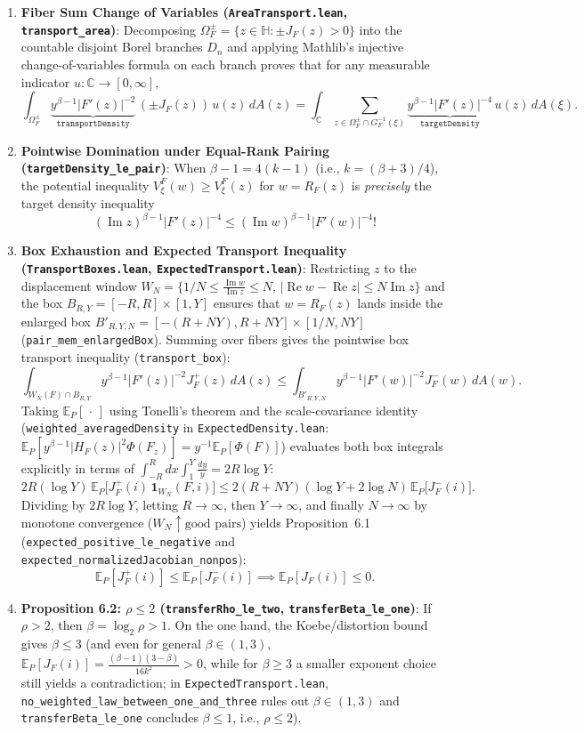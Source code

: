 \documentclass[11pt,reqno]{amsart}
\theoremstyle{definition}
\newcommand{\C}{\mathbb{C}}
\newcommand{\uhp}{\mathbb{H}}
\newcommand{\E}{\mathbb{E}}
\newcommand{\ImPart}{\operatorname{Im}}
\newcommand{\RePart}{\operatorname{Re}}
\begin{document}
\begin{enumerate}[label=(\arabic*)]
\item \textbf{Fiber Sum Change of Variables (\texttt{AreaTransport.lean}, \texttt{transport\_area})}:
Decomposing $\Omega_F^\pm = \{z \in \uhp : \pm J_F(z) > 0\}$ into the countable disjoint Borel branches $D_n$ and applying Mathlib's injective change-of-variables formula on each branch proves that for any measurable indicator $u : \C \to [0,\infty]$,
\[
\int_{\Omega_F^\pm} \underbrace{y^{\beta-1}|F'(z)|^{-2}}_{\texttt{transportDensity}}\,(\pm J_F(z))\,u(z)\,dA(z)
= \int_{\C} \sum_{z \in \Omega_F^\pm \cap G_F^{-1}(\xi)} \underbrace{y^{\beta-1}|F'(z)|^{-4}}_{\texttt{targetDensity}}\,u(z)\,dA(\xi).
\]
\item \textbf{Pointwise Domination under Equal-Rank Pairing (\texttt{targetDensity\_le\_pair})}:
When $\beta - 1 = 4(k-1)$ (i.e., $k = (\beta+3)/4$), the potential inequality $V_\xi^F(w) \ge V_\xi^F(z)$ for $w = R_F(z)$ is \emph{precisely} the target density inequality
\[
(\ImPart z)^{\beta-1}|F'(z)|^{-4} \le (\ImPart w)^{\beta-1}|F'(w)|^{-4}!
\]
\item \textbf{Box Exhaustion and Expected Transport Inequality (\texttt{TransportBoxes.lean}, \texttt{ExpectedTransport.lean})}:
Restricting $z$ to the displacement window $W_N = \{1/N \le \frac{\ImPart w}{\ImPart z} \le N,\, |\RePart w - \RePart z| \le N \ImPart z\}$ and the box $B_{R,Y} = [-R,R]\times[1,Y]$ ensures that $w = R_F(z)$ lands inside the enlarged box $B'_{R,Y,N} = [-(R+NY), R+NY]\times[1/N, NY]$ (\texttt{pair\_mem\_enlargedBox}). Summing over fibers gives the pointwise box transport inequality (\texttt{transport\_box}):
\[
\int_{W_N(F) \cap B_{R,Y}} y^{\beta-1}|F'(z)|^{-2} J_F^+(z)\,dA(z)
\le \int_{B'_{R,Y,N}} y^{\beta-1}|F'(w)|^{-2} J_F^-(w)\,dA(w).
\]
Taking $\E_P[\,\cdot\,]$ using Tonelli's theorem and the scale-covariance identity (\texttt{weighted\_averagedDensity} in \texttt{ExpectedDensity.lean}: $\E_P[y^{\beta-1}|H_F(z)|^2 \Phi(F_z)] = y^{-1}\E_P[\Phi(F)]$) evaluates both box integrals explicitly in terms of $\int_{-R}^R dx \int_1^Y \frac{dy}{y} = 2R\log Y$:
\[
2R(\log Y)\,\E_P\bigl[J_F^+(i)\,\mathbf{1}_{W_N}(F,i)\bigr]
\le 2(R+NY)(\log Y + 2\log N)\,\E_P\bigl[J_F^-(i)\bigr].
\]
Dividing by $2R\log Y$, letting $R \to \infty$, then $Y \to \infty$, and finally $N \to \infty$ by monotone convergence ($W_N \uparrow \text{good pairs}$) yields Proposition~6.1 (\texttt{expected\_positive\_le\_negative} and \texttt{expected\_normalizedJacobian\_nonpos}):
\[
\E_P[J_F^+(i)] \le \E_P[J_F^-(i)] \implies \E_P[J_F(i)] \le 0.
\]
\item \textbf{Proposition 6.2: $\rho \le 2$ (\texttt{transferRho\_le\_two}, \texttt{transferBeta\_le\_one})}:
If $\rho > 2$, then $\beta = \log_2 \rho > 1$. On the one hand, the Koebe/distortion bound gives $\beta \le 3$ (and even for general $\beta \in (1,3)$, $\E_P[J_F(i)] = \frac{(\beta-1)(3-\beta)}{16k^2} > 0$, while for $\beta \ge 3$ a smaller exponent choice still yields a contradiction; in \texttt{ExpectedTransport.lean}, \texttt{no\_weighted\_law\_between\_one\_and\_three} rules out $\beta \in (1,3)$ and \texttt{transferBeta\_le\_one} concludes $\beta \le 1$, i.e., $\rho \le 2$).
\end{enumerate}
\end{document}
